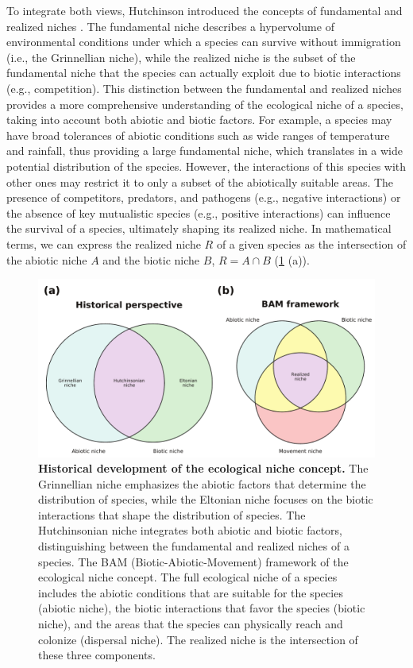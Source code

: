To integrate both views, Hutchinson introduced the concepts of
fundamental and realized niches \cite{Hutchinson1957}. The fundamental niche
describes a hypervolume of environmental conditions under which a species can
survive without immigration (i.e., the Grinnellian niche), while the realized
niche is the subset of the fundamental niche that the species can actually
exploit due to biotic interactions (e.g., competition). This distinction
between the fundamental and realized niches provides a more comprehensive
understanding of the ecological niche of a species, taking into account both
abiotic and biotic factors. For example, a species may have broad tolerances of
abiotic conditions such as wide ranges of temperature and rainfall, thus
providing a large fundamental niche, which translates in a wide potential
distribution of the species. However, the interactions of this species with
other ones may restrict it to only a subset of the abiotically suitable areas.
The presence of competitors, predators, and pathogens (e.g., negative
interactions) or the absence of key mutualistic species (e.g., positive
interactions) can influence the survival of a species, ultimately shaping its
realized niche. In mathematical terms, we can express the realized niche $R$ of
a given species as the intersection of the abiotic niche $A$ and the biotic
niche $B$, $R=A\cap B$ (\cref{fig:niche_concept} (a)).

\begin{figure}[H]
  \centering
  \includegraphics[width=1\textwidth]{Figures/Niche_theory.pdf}
  \caption[Historical development of the ecological niche concept]{
    \textbf{Historical development of the ecological niche concept.} The
    Grinnellian niche emphasizes the abiotic factors that determine the
    distribution of species, while the Eltonian niche focuses on the biotic
    interactions that shape the distribution of species. The Hutchinsonian
    niche integrates both abiotic and biotic factors, distinguishing
    between the fundamental and realized niches of a species. The BAM
    (Biotic-Abiotic-Movement) framework of the ecological niche concept. The
    full ecological niche of a species includes the abiotic conditions that
    are
    suitable for the species (abiotic niche), the biotic interactions that
    favor the species (biotic niche), and the areas that the species can
    physically reach and colonize (dispersal niche). The realized niche is
    the
    intersection of these three components.}
  \label{fig:niche_concept}
\end{figure}

